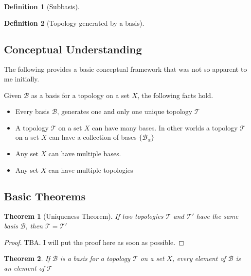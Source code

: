 \documentclass{article}
\newtheorem{theorem}{Theorem}[section]
\theoremstyle{remark}
\theoremstyle{definition}
\newtheorem{definition}{Definition}[section]
\begin{document}
\begin{definition}[Subbasis]

\end{definition}

\begin{definition}[Topology generated by a basis]

\end{definition}

\newpage


\subsection{Conceptual Understanding}

The following provides a basic conceptual framework that was not so apparent to me initially. 

\medskip

Given $\mathcal{B}$ as a basis for a topology on a set $X$, the following facts hold. 

\begin{itemize}
  \item Every basis $\mathcal{B}$, generates one and only one unique topology $\mathcal{T}$
  \item A topology $\mathcal{T}$ on a set $X$ can have many bases. In other worlds a topology $\mathcal{T}$ on a set $X$ can have a collection of bases $\{\mathcal{B_{\alpha}}\}$
  \item Any set $X$ can have multiple bases.
  \item Any set $X$ can have multiple topologies
\end{itemize}

\hrulefill

\subsection{Basic Theorems}

\medskip

\begin{theorem}[Uniqueness Theorem]
If two topologies $\mathcal{T}$ and $\mathcal{T'}$ have the same basis $\mathcal{B}$, then $\mathcal{T} = \mathcal{T'}$
\end{theorem}

\begin{proof}
TBA. I will put the proof here as soon as possible.
\end{proof}

\medskip

\begin{theorem}
If $\mathcal{B}$ is a basis for a topology $\mathcal{T}$ on a set $X$, every element of $\mathcal{B}$ is an element of $\mathcal{T}$
\end{theorem}
\end{document}

